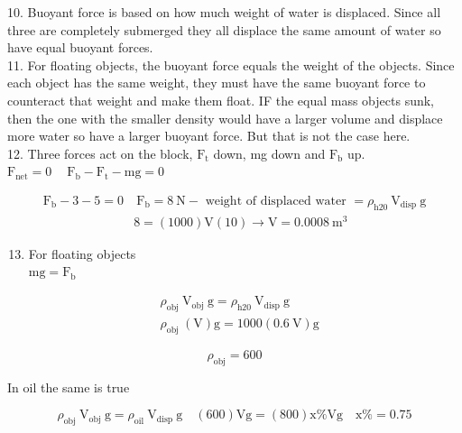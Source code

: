 \begin{enumerate}
10. Buoyant force is based on how much weight of water is displaced. Since all three are completely submerged they all displace the same amount of water so have equal buoyant forces.\\
11. For floating objects, the buoyant force equals the weight of the objects. Since each object has the same weight, they must have the same buoyant force to counteract that weight and make them float. IF the equal mass objects sunk, then the one with the smaller density would have a larger volume and displace more water so have a larger buoyant force. But that is not the case here.\\
12. Three forces act on the block, $\mathrm{F}_{\mathrm{t}}$ down, mg down and $\mathrm{F}_{\mathrm{b}}$ up. $\mathrm{F}_{\mathrm{net}}=0 \quad \mathrm{~F}_{\mathrm{b}}-\mathrm{F}_{\mathrm{t}}-\mathrm{mg}=0$

$$
\begin{array}{ll}
\mathrm{F}_{\mathrm{b}}-3-5=0 & \mathrm{~F}_{\mathrm{b}}=8 \mathrm{~N}-\text { weight of displaced water }=\rho_{\mathrm{h} 20} \mathrm{~V}_{\text {disp }} \mathrm{g} \\
& 8=(1000) \mathrm{V}(10) \rightarrow \mathrm{V}=0.0008 \mathrm{~m}^{3}
\end{array}
$$

\begin{enumerate}
  \setcounter{enumi}{12}
  \item For floating objects\\
$\mathrm{mg}=\mathrm{F}_{\mathrm{b}}$
\end{enumerate}

$$
\begin{aligned}
& \rho_{\text {obj }} \mathrm{V}_{\text {obj }} \mathrm{g}=\rho_{\mathrm{h} 20} \mathrm{~V}_{\text {disp }} \mathrm{g} \\
& \rho_{\text {obj }}(\mathrm{V}) \mathrm{g}=1000(0.6 \mathrm{~V}) \mathrm{g}
\end{aligned}
$$

$$
\rho_{\mathrm{obj}}=600
$$

In oil the same is true

$$
\rho_{\text {obj }} \mathrm{V}_{\text {obj }} \mathrm{g}=\rho_{\text {oil }} \mathrm{V}_{\text {disp }} \mathrm{g} \quad(600) \mathrm{Vg}=(800) \mathrm{x} \% \mathrm{Vg} \quad \mathrm{x} \%=0.75
$$


\end{enumerate}

